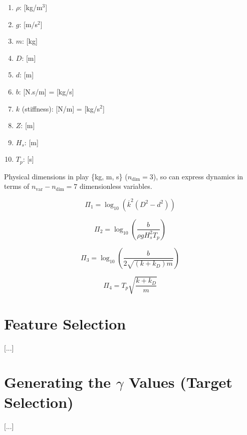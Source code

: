 \begin{enumerate}
	\item $\rho$: [kg/m$^3$]
	\item $g$: [m/s$^2$]
	\item $m$: [kg]
	\item $D$: [m]
	\item $d$: [m]
	\item $b$: [N.s/m] = [kg/s]
	\item $k$ (stiffness): [N/m] = [kg/s$^2$] 
	\item $Z$: [m]
	\item $H_s$: [m]
	\item $T_p$: [s]
\end{enumerate}

\noindent Physical dimensions in play \{kg, m, s\} ($n_\textrm{dim} = 3$), so can express dynamics in terms of $n_\textrm{var} - n_\textrm{dim} = 7$ dimensionless variables.

\begin{equation}
	\Pi_1 = \log_{10}\left(\overline{k}^2\left(D^2 - d^2\right)\right)
	\label{eqn:Pi_1}
\end{equation}

\begin{equation}
	\Pi_2 = \log_{10}\left(\frac{b}{\rho g H_s^2T_p}\right)
	\label{eqn:Pi_2}
\end{equation}

\begin{equation}
	\Pi_3 = \log_{10}\left(\frac{b}{2\sqrt{(k + k_D)m}}\right)
	\label{eqn:Pi_3}
\end{equation}

\begin{equation}
	\Pi_4 = T_p\sqrt{\frac{k + k_D}{m}}
	\label{eqn:Pi_4}
\end{equation}

\section{Feature Selection}

[...]

\section{Generating the $\gamma$ Values (Target Selection)}

[...]